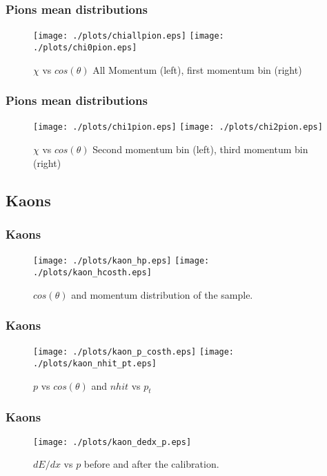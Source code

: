 \documentclass{beamer}
\begin{document}
\begin{frame}\frametitle{Pions mean distributions}
\begin{figure}[!htp]
\centering
\texttt{[image: ./plots/chiallpion.eps]}
\texttt{[image: ./plots/chi0pion.eps]}
\caption{$\chi$ vs $cos(\theta)$ All Momentum (left), first momentum bin (right)}
\end{figure}
\end{frame}

\begin{frame}\frametitle{Pions mean distributions}
\begin{figure}[!htp]
\centering
\texttt{[image: ./plots/chi1pion.eps]}
\texttt{[image: ./plots/chi2pion.eps]}
\caption{$\chi$ vs $cos(\theta)$ Second momentum bin (left), third momentum bin (right)}
\end{figure}
\end{frame}

\subsection{Kaons}
\begin{frame}\frametitle{Kaons}
\begin{figure}
\texttt{[image: ./plots/kaon\_hp.eps]} 
\texttt{[image: ./plots/kaon\_hcosth.eps]} 
\caption{$cos(\theta)$ and momentum distribution of the sample.}
\end{figure}
\end{frame}

\begin{frame}\frametitle{Kaons}
\begin{figure}
\texttt{[image: ./plots/kaon\_p\_costh.eps]} 
\texttt{[image: ./plots/kaon\_nhit\_pt.eps]} 
\caption{$p$ vs $cos(\theta)$ and $nhit$ vs $p_{t}$}
\end{figure}
\end{frame}

\begin{frame}\frametitle{Kaons}
\begin{figure}
\texttt{[image: ./plots/kaon\_dedx\_p.eps]} 
\caption{$dE/dx$ vs $p$ before and after the calibration.}
\end{figure}
\end{frame}
\end{document}
